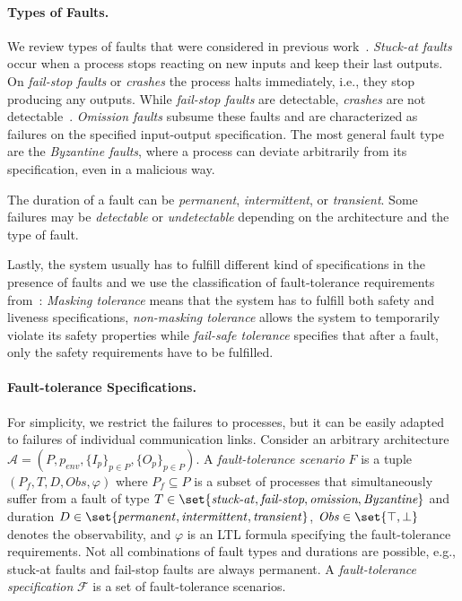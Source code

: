 \documentclass{LMCS}
\newcommand{\btrue}{\top}
\newcommand{\bfalse}{\perp}
\theoremstyle{plain}\newtheorem{theorem}[thm]{Theorem}
\theoremstyle{plain}\newtheorem{lemma}[thm]{Lemma}
\theoremstyle{plain}\newtheorem{proposition}[thm]{Proposition}
\theoremstyle{plain}\newtheorem{corollary}[thm]{Corollary}
\theoremstyle{definition}\newtheorem{definition}{Definition}[section]
\begin{document}
\paragraph{\bf Types of Faults.}
We review types of faults that were considered in previous work~\cite{DBLP:conf/ftdc/DolevS86,DBLP:journals/toplas/AttieAE04,DBLP:conf/atva/DimitrovaF09}.
\emph{Stuck-at faults} occur when a process stops reacting on new inputs and keep their last outputs.
On \emph{fail-stop faults} or \emph{crashes} the process halts immediately, i.e., they stop producing any outputs.
While \emph{fail-stop faults} are detectable, \emph{crashes} are not detectable~\cite{DBLP:conf/ftdc/DolevS86}.
\emph{Omission faults} subsume these faults and are characterized as failures on the specified input-output specification.
The most general fault type are the \emph{Byzantine faults}, where a process can deviate arbitrarily from its specification, even in a malicious way.

The duration of a fault can be \emph{permanent}, \emph{intermittent}, or \emph{transient}.
Some failures may be \emph{detectable} or \emph{undetectable} depending on the architecture and the type of fault.

Lastly, the system usually has to fulfill different kind of specifications in the presence of faults and we use the classification of fault-tolerance requirements from~\cite{DBLP:conf/atva/DimitrovaF09}: \emph{Masking tolerance} means that the system has to fulfill both safety and liveness specifications, \emph{non-masking tolerance} allows the system to temporarily violate its safety properties while \emph{fail-safe tolerance} specifies that after a fault, only the safety requirements have to be fulfilled.


\paragraph{\bf Fault-tolerance Specifications.}
For simplicity, we restrict the failures to processes, but it can be easily adapted to failures of individual communication links.
Consider an arbitrary architecture $\mathcal{A} = (P,p_\mathit{env},\{I_p\}_{p \in P}, \{O_p\}_{p \in P})$.
A \emph{fault-tolerance scenario} $F$ is a tuple $(P_f,T,D,\mathit{Obs},\varphi)$ where $P_f \subseteq P$ is a subset of processes that simultaneously suffer from a fault of type $T \in \set{\mathit{stuck\text{-}\hspace{-0.4pt}at}, \emph{fail-stop}, \emph{omission},\emph{Byzantine}}$ and duration $D \in \set{\mathit{permanent}, \mathit{intermittent}, \mathit{transient}}$, $\mathit{Obs} \in \set{\btrue,\bfalse}$ denotes the observability, and $\varphi$ is an LTL formula specifying the fault-tolerance requirements.
Not all combinations of fault types and durations are possible, e.g., stuck-at faults and fail-stop faults are always permanent.
A \emph{fault-tolerance specification} $\mathcal{F}$ is a set of fault-tolerance scenarios.
\end{document}
